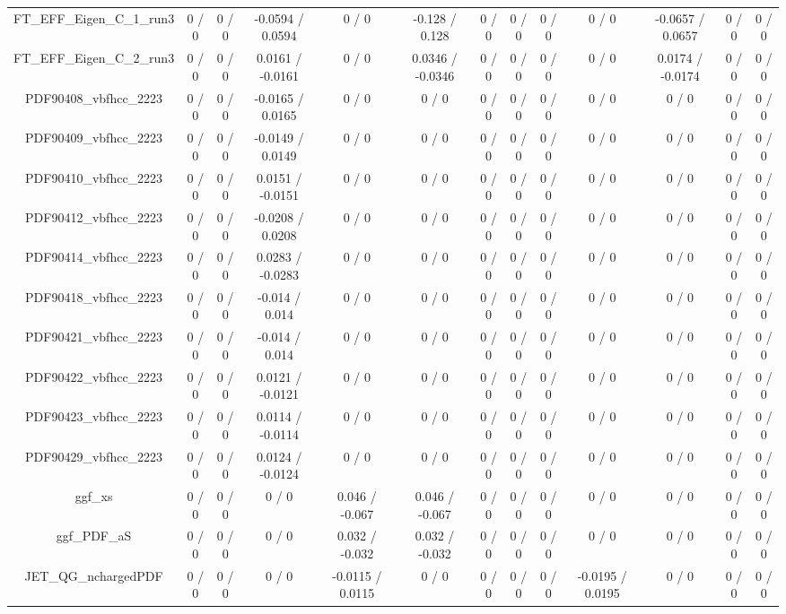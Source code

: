 \documentclass[10pt]{article}
\begin{document}
\begin{table}[htbp]
\begin{center}
\begin{tabular}{|c|c|c|c|c|c|c|c|c|c|c|c|c|}
  FT_EFF_Eigen_C_1_run3 & 0 / 0 & 0 / 0 & -0.0594 / 0.0594 & 0 / 0 & -0.128 / 0.128 & 0 / 0 & 0 / 0 & 0 / 0 & 0 / 0 & -0.0657 / 0.0657 & 0 / 0 & 0 / 0 \\ 
  FT_EFF_Eigen_C_2_run3 & 0 / 0 & 0 / 0 & 0.0161 / -0.0161 & 0 / 0 & 0.0346 / -0.0346 & 0 / 0 & 0 / 0 & 0 / 0 & 0 / 0 & 0.0174 / -0.0174 & 0 / 0 & 0 / 0 \\ 
  PDF90408_vbfhcc_2223 & 0 / 0 & 0 / 0 & -0.0165 / 0.0165 & 0 / 0 & 0 / 0 & 0 / 0 & 0 / 0 & 0 / 0 & 0 / 0 & 0 / 0 & 0 / 0 & 0 / 0 \\ 
  PDF90409_vbfhcc_2223 & 0 / 0 & 0 / 0 & -0.0149 / 0.0149 & 0 / 0 & 0 / 0 & 0 / 0 & 0 / 0 & 0 / 0 & 0 / 0 & 0 / 0 & 0 / 0 & 0 / 0 \\ 
  PDF90410_vbfhcc_2223 & 0 / 0 & 0 / 0 & 0.0151 / -0.0151 & 0 / 0 & 0 / 0 & 0 / 0 & 0 / 0 & 0 / 0 & 0 / 0 & 0 / 0 & 0 / 0 & 0 / 0 \\ 
  PDF90412_vbfhcc_2223 & 0 / 0 & 0 / 0 & -0.0208 / 0.0208 & 0 / 0 & 0 / 0 & 0 / 0 & 0 / 0 & 0 / 0 & 0 / 0 & 0 / 0 & 0 / 0 & 0 / 0 \\ 
  PDF90414_vbfhcc_2223 & 0 / 0 & 0 / 0 & 0.0283 / -0.0283 & 0 / 0 & 0 / 0 & 0 / 0 & 0 / 0 & 0 / 0 & 0 / 0 & 0 / 0 & 0 / 0 & 0 / 0 \\ 
  PDF90418_vbfhcc_2223 & 0 / 0 & 0 / 0 & -0.014 / 0.014 & 0 / 0 & 0 / 0 & 0 / 0 & 0 / 0 & 0 / 0 & 0 / 0 & 0 / 0 & 0 / 0 & 0 / 0 \\ 
  PDF90421_vbfhcc_2223 & 0 / 0 & 0 / 0 & -0.014 / 0.014 & 0 / 0 & 0 / 0 & 0 / 0 & 0 / 0 & 0 / 0 & 0 / 0 & 0 / 0 & 0 / 0 & 0 / 0 \\ 
  PDF90422_vbfhcc_2223 & 0 / 0 & 0 / 0 & 0.0121 / -0.0121 & 0 / 0 & 0 / 0 & 0 / 0 & 0 / 0 & 0 / 0 & 0 / 0 & 0 / 0 & 0 / 0 & 0 / 0 \\ 
  PDF90423_vbfhcc_2223 & 0 / 0 & 0 / 0 & 0.0114 / -0.0114 & 0 / 0 & 0 / 0 & 0 / 0 & 0 / 0 & 0 / 0 & 0 / 0 & 0 / 0 & 0 / 0 & 0 / 0 \\ 
  PDF90429_vbfhcc_2223 & 0 / 0 & 0 / 0 & 0.0124 / -0.0124 & 0 / 0 & 0 / 0 & 0 / 0 & 0 / 0 & 0 / 0 & 0 / 0 & 0 / 0 & 0 / 0 & 0 / 0 \\ 
  ggf_xs & 0 / 0 & 0 / 0 & 0 / 0 & 0.046 / -0.067 & 0.046 / -0.067 & 0 / 0 & 0 / 0 & 0 / 0 & 0 / 0 & 0 / 0 & 0 / 0 & 0 / 0 \\ 
  ggf_PDF_aS & 0 / 0 & 0 / 0 & 0 / 0 & 0.032 / -0.032 & 0.032 / -0.032 & 0 / 0 & 0 / 0 & 0 / 0 & 0 / 0 & 0 / 0 & 0 / 0 & 0 / 0 \\ 
  JET_QG_nchargedPDF & 0 / 0 & 0 / 0 & 0 / 0 & -0.0115 / 0.0115 & 0 / 0 & 0 / 0 & 0 / 0 & 0 / 0 & -0.0195 / 0.0195 & 0 / 0 & 0 / 0 & 0 / 0 \\ 

\end{tabular}
\end{center}
\end{table}
\end{document}
